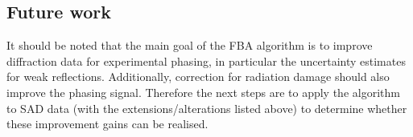 \subsection{Future work}
\label{sub:Future work}
It should be noted that the main goal of the FBA algorithm is to improve diffraction data for experimental phasing, in particular the uncertainty estimates for weak reflections.
Additionally, correction for radiation damage should also improve the phasing signal.
Therefore the next steps are to apply the algorithm to SAD data (with the extensions/alterations listed above) to determine whether these improvement gains can be realised.
